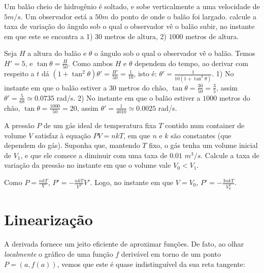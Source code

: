 \begin{exo}
Um balão cheio de hidrogênio é soltado, e sobe verticalmente a 
uma velocidade de $5m/s$. Um observador está a $50m$ do ponto de onde 
o balão foi largado. calcule a taxa de variação do ângulo sob o qual o
observador vê o balão subir, no instante em que este se encontra a 1) $30$
metros de
altura, 2) $1000$ metros de altura.
\begin{sol}
Seja $H$ a altura do balão e $\theta$ o ângulo sob o qual o observador vê o
balão. Temos $H'=5$, e $\tan \theta=\frac{H}{50}$. Como ambos $H$ e
$\theta$ dependem do tempo, ao derivar com respeito a $t$ dá 
$(1+\tan^2\theta)\theta'=\frac{H'}{50}=\frac{1}{10}$, isto é:
$\theta'=\frac{1}{10(1+\tan^2\theta)}$.
1) No instante em que o balão estiver a $30$ metros do chão, $\tan
\theta=\frac{30}{50}=\tfrac35$, assim $\theta'=\frac{5}{68}\simeq 0.0735$
rad/s. 
2) No instante em que o balão estiver a $1000$ metros do chão, $\tan
\theta=\frac{1000}{50}=20$, assim $\theta'=\frac{1}{4010}\simeq 0.0025$ rad/s.
\end{sol}
\end{exo}

\begin{exo}
A pressão $P$ de um gás ideal de temperatura fixa $T$ contido num container de
volume $V$ satisfaz à equação $PV=nkT$, em que $n$ e $k$ são constantes (que
dependem do gás). Suponha que, mantendo $T$ fixo, o gás tenha um
volume inicial de $V_1$, e que ele comece a diminuir com uma
taxa de $0.01$ $m^3/s$. Calcule a taxa de variação da pressão no instante em que
o volume vale $V_0<V_1$.
\begin{sol}
Como $P=\frac{nkT}{V}$, $P'=-\frac{nkT}{V^2}V'$. Logo,
no instante em que $V=V_0$,
$P'=-\frac{3nkT}{V_0^2}$.
\end{sol}
\end{exo}


\section{Linearização}

A derivada fornece um jeito eficiente de aproximar funções.
De fato, ao olhar \emph{localmente} o gráfico de uma função $f$ derivável 
em torno de um
ponto $P=(a,f(a))$, vemos que este é quase indistinguível da sua reta
tangente:

